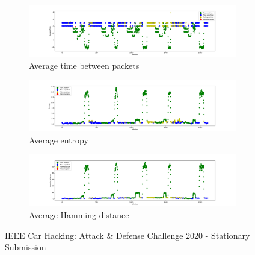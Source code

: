 \begin{figure}
    \centering
    \begin{subfigure}[b]{\linewidth}
        \includegraphics[width = \linewidth]{img/parts/app/tests/ieee/stationary_submission/AvgTime.png}
        \caption{Average time between packets}
        \label{subfig:extract_ieee_s_s_avgtime}
    \end{subfigure}
    \begin{subfigure}[b]{\linewidth}
        \includegraphics[width = \linewidth]{img/parts/app/tests/ieee/stationary_submission/Entropy.png}
        \caption{Average entropy}
        \label{subfig:extract_ieee_s_s_entropy}
    \end{subfigure}
    \begin{subfigure}[b]{\linewidth}
        \includegraphics[width = \linewidth]{img/parts/app/tests/ieee/stationary_submission/HammingDist.png}
        \caption{Average Hamming distance}
        \label{subfig:extract_ieee_s_s_hammingdist}
    \end{subfigure}
    \caption{IEEE Car Hacking: Attack \& Defense Challenge 2020 - Stationary Submission}
    \label{fig:extract_ieee_s_s}
\end{figure}

